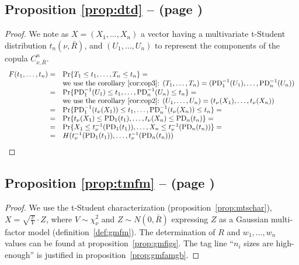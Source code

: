 \documentclass[11pt,fleqn]{book} %
\begin{document}
\subsection{Proposition \ref{prop:dtd} --  (page \pageref{prop:dtd})}
\begin{proof}
	We note as $X=(X_1,\dots,X_n)$ a vector having a multivariate t-Student
	distribution $t_n(\nu,\bar{R})$, and $(U_1,\dots,U_n)$ to represent
	the components of the copula $C_{\nu,\bar{R}}^n$.
	\begin{displaymath}
		\begin{array}{rl}
			F(t_1,\dots,t_n) = & \Pr\{ T_1 \le t_1 , \dots, T_n \le t_n \} =                                    \\
			                   & \text{we use the corollary~\ref{cor:cop3}: }                                   
			(T_1,\dots,T_n) = (\text{PD}_1^{-1}(U_1),\dots,\text{PD}_n^{-1}(U_n)) \\
			=                  & \Pr\{ \text{PD}_1^{-1}(U_1) \le t_1 , \dots , \text{PD}_n^{-1}(U_n) \le t_n \} =               \\
			                   & \text{we use the corollary~\ref{cor:cop2}: }                                   
			(U_1,\dots,U_n) = (t_\nu(X_1),\dots,t_\nu(X_n)) \\
			=                  & \Pr\{ \text{PD}_1^{-1}(t_\nu(X_1)) \le t_1 , \dots , \text{PD}_n^{-1}(t_\nu(X_n)) \le t_n \} = \\
			=                  & \Pr\{ t_\nu(X_1) \le \text{PD}_1(t_1) , \dots , t_\nu(X_n) \le \text{PD}_n(t_n) \} =           \\
			=                  & \Pr\{ X_1 \le t_\nu^{-1}(\text{PD}_1(t_1)) , \dots , X_n \le t_\nu^{-1}(\text{PD}_n(t_n)) \} = \\
			=                  & H(t_\nu^{-1}(\text{PD}_1(t_1)), \dots, t_\nu^{-1}(\text{PD}_n(t_n)))                           \\
		\end{array}
	\end{displaymath}
\end{proof}

\subsection{Proposition \ref{prop:tmfm} --  (page \pageref{prop:tmfm})}
\begin{proof}
	We use the t-Student characterization (proposition~\ref{prop:mtschar}),
	$X = \sqrt{\frac{\nu}{V}} \cdot Z$, where $V \sim \chi_{\nu}^2$ and 
	$Z \sim N(0,\bar{R})$ expressing $Z$ as a Gaussian multi-factor model 
	(definition~\ref{def:gmfm}). The determination of $R$ and $w_1,\dots,w_n$
	values can be found at proposition~\ref{prop:gmfigs}. The tag line 
	\enquote{$n_i$ sizes are high-enough} is justified in 
	proposition~\ref{prop:gmfamgb}.
\end{proof}
\end{document}
